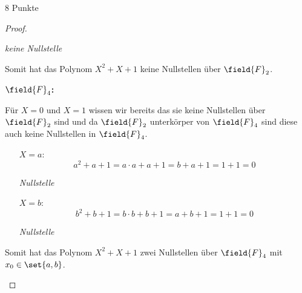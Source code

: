 \documentclass{problemset}
\begin{document}
\begin{problem}{8 Punkte}
\begin{proof}
\begin{enumerate}
\begin{itemize}
			            \textit{keine Nullstelle}

		      \end{itemize}

		      Somit hat das Polynom $X^2 + X + 1$ keine Nullstellen über $\field{F}_2$.

		      \textbf{$\field{F}_4$:}

		      Für $X = 0$ und $X = 1$ wissen wir bereits das sie keine Nullstellen über $\field{F}_2$ sind und da $\field{F}_2$ unterkörper von $\field{F}_4$ sind diese auch keine Nullstellen in $\field{F}_4$.
		      \begin{itemize}
			      \item [$X = a$:]
			            \[
				            a^2 + a + 1 = a \cdot a + a + 1 = b + a + 1 = 1 + 1 = 0
			            \]

			            \textit{Nullstelle} \checkmark

			      \item [$X = b$:]
			            \[
				            b^2 + b + 1 = b \cdot b + b + 1 = a + b + 1 = 1 + 1 = 0
			            \]

			            \textit{Nullstelle} \checkmark

		      \end{itemize}

		      Somit hat das Polynom $X^2 + X + 1$ zwei Nullstellen über $\field{F}_4$ mit $x_0 \in \set{a,b}$.
	\end{enumerate}
\end{proof}
\end{problem}
\end{document}
